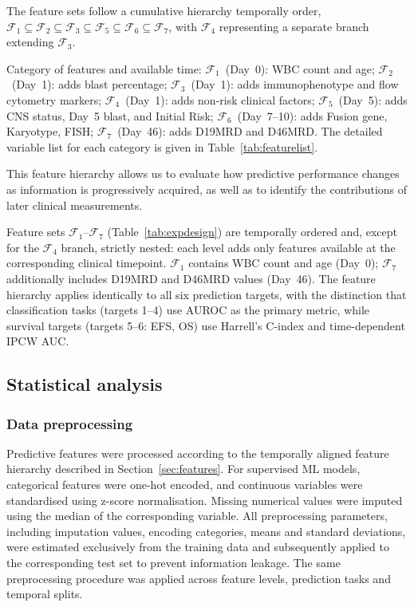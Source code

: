 \documentclass[pdflatex,sn-nature]{sn-jnl}
\begin{document}
The feature sets follow a cumulative hierarchy temporally order,
$\mathcal{F}_1 \subseteq \mathcal{F}_2 \subseteq
\mathcal{F}_3 \subseteq \mathcal{F}_5 \subseteq
\mathcal{F}_6 \subseteq \mathcal{F}_7$,
with $\mathcal{F}_4$ representing a separate branch extending
$\mathcal{F}_3$. 

Category of features and available time: $\mathcal{F}_1$~(Day~0): WBC count and age;
$\mathcal{F}_2$~(Day~1): adds blast percentage;
$\mathcal{F}_3$~(Day~1): adds immunophenotype and flow cytometry markers;
$\mathcal{F}_4$~(Day~1): adds non-risk clinical factors;
$\mathcal{F}_5$~(Day~5): adds CNS status, Day~5 blast, and Initial Risk;
$\mathcal{F}_6$~(Day~7--10): adds Fusion gene, Karyotype, FISH;
$\mathcal{F}_7$~(Day~46): adds D19MRD and D46MRD.
The detailed variable list for each category is given in
Table~\ref{tab:featurelist}. 

This feature hierarchy allows us to evaluate how predictive performance changes as information is progressively acquired, as well as to identify the contributions of later clinical measurements.


Feature sets $\mathcal{F}_1$--$\mathcal{F}_7$
(Table~\ref{tab:expdesign}) are temporally ordered and, except for the
$\mathcal{F}_4$ branch, strictly nested: each level adds only features
available at the corresponding clinical timepoint.
$\mathcal{F}_1$ contains WBC count and age (Day~0);
$\mathcal{F}_7$ additionally includes D19MRD and D46MRD values (Day~46).
The feature hierarchy applies identically to all six prediction
targets, with the distinction that classification tasks (targets 1--4)
use AUROC as the primary metric, while survival targets (targets 5--6:
EFS, OS) use Harrell's C-index and time-dependent IPCW AUC.

\subsection{Statistical analysis}

\subsubsection{Data preprocessing}
\label{sec:preprocessing}

Predictive features were processed according to the temporally aligned feature hierarchy described in Section~\ref{sec:features}. For supervised ML models, categorical features were one-hot encoded, and continuous variables were standardised using z-score normalisation. Missing numerical values were imputed using the median of the corresponding variable. All preprocessing parameters, including imputation values, encoding categories, means and standard deviations, were estimated exclusively from the training data and subsequently applied to the corresponding test set to prevent information leakage. The same preprocessing procedure was applied across feature levels, prediction tasks and temporal splits.
\end{document}
